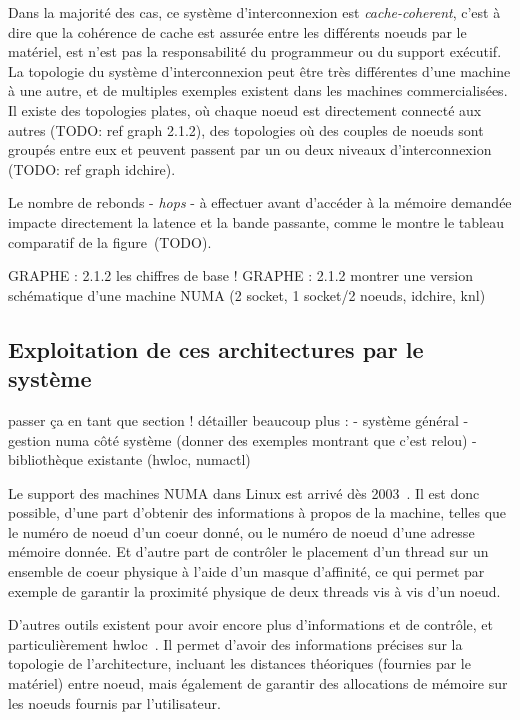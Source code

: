 Dans la majorité des cas, ce système d'interconnexion est \emph{cache-coherent}, c'est à dire que la cohérence de cache est assurée entre les différents noeuds par le matériel, est n'est pas la responsabilité du programmeur ou du support exécutif.
La topologie du système d'interconnexion peut être très différentes d'une machine à une autre, et de multiples exemples existent dans les machines commercialisées.
Il existe des topologies plates, où chaque noeud est directement connecté aux autres (TODO: ref graph 2.1.2), des topologies où des couples de noeuds sont groupés entre eux et peuvent passent par un ou deux niveaux d'interconnexion (TODO: ref graph idchire).

Le nombre de rebonds - \emph{hops} - à effectuer avant d'accéder à la mémoire demandée impacte directement la latence et la bande passante, comme le montre le tableau comparatif de la figure~(TODO).

GRAPHE : 2.1.2 les chiffres de base !
GRAPHE : 2.1.2 montrer une version schématique d'une machine NUMA (2 socket, 1 socket/2 noeuds, idchire, knl)


\subsection{Exploitation de ces architectures par le système}\label{sec:context:numa:os}
\begin{todo}
  passer ça en tant que section !
  détailler beaucoup plus :
   - système général
   - gestion numa côté système (donner des exemples montrant que c'est relou)
   - bibliothèque existante (hwloc, numactl)
\end{todo}

Le support des machines NUMA dans Linux est arrivé dès 2003~\cite{Dobson2003}.
Il est donc possible, d'une part d'obtenir des informations à propos de la machine, telles que le numéro de noeud d'un coeur donné, ou le numéro de noeud d'une adresse mémoire donnée.
Et d'autre part de contrôler le placement d'un thread sur un ensemble de coeur physique à l'aide d'un masque d'affinité, ce qui permet par exemple de garantir la proximité physique de deux threads vis à vis d'un noeud.

D'autres outils existent pour avoir encore plus d'informations et de contrôle, et particulièrement hwloc~\cite{Broquedis2010}.
Il permet d'avoir des informations précises sur la topologie de l'architecture, incluant les distances théoriques (fournies par le matériel) entre noeud, mais également de garantir des allocations de mémoire sur les noeuds fournis par l'utilisateur.

